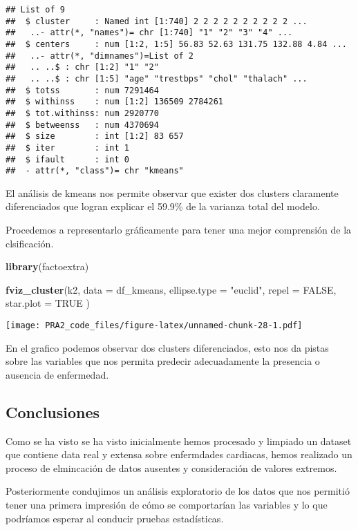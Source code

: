 \documentclass[
]{article}
\newenvironment{Shaded}{\begin{snugshade}}{\end{snugshade}}
\newcommand{\DataTypeTok}[1]{\textcolor[rgb]{0.13,0.29,0.53}{#1}}
\newcommand{\KeywordTok}[1]{\textcolor[rgb]{0.13,0.29,0.53}{\textbf{#1}}}
\newcommand{\NormalTok}[1]{#1}
\newcommand{\OtherTok}[1]{\textcolor[rgb]{0.56,0.35,0.01}{#1}}
\newcommand{\StringTok}[1]{\textcolor[rgb]{0.31,0.60,0.02}{#1}}
\begin{document}
\begin{verbatim}
## List of 9
##  $ cluster     : Named int [1:740] 2 2 2 2 2 2 2 2 2 2 ...
##   ..- attr(*, "names")= chr [1:740] "1" "2" "3" "4" ...
##  $ centers     : num [1:2, 1:5] 56.83 52.63 131.75 132.88 4.84 ...
##   ..- attr(*, "dimnames")=List of 2
##   .. ..$ : chr [1:2] "1" "2"
##   .. ..$ : chr [1:5] "age" "trestbps" "chol" "thalach" ...
##  $ totss       : num 7291464
##  $ withinss    : num [1:2] 136509 2784261
##  $ tot.withinss: num 2920770
##  $ betweenss   : num 4370694
##  $ size        : int [1:2] 83 657
##  $ iter        : int 1
##  $ ifault      : int 0
##  - attr(*, "class")= chr "kmeans"
\end{verbatim}

El análisis de kmeans nos permite observar que exister dos clusters
claramente diferenciados que logran explicar el 59.9\% de la varianza
total del modelo.

Procedemos a representarlo gráficamente para tener una mejor comprensión
de la clsificación.

\begin{Shaded}
\begin{Highlighting}[]
\KeywordTok{library}\NormalTok{(factoextra)}

\KeywordTok{fviz_cluster}\NormalTok{(k2, }\DataTypeTok{data =}\NormalTok{ df_kmeans, }\DataTypeTok{ellipse.type =} \StringTok{"euclid"}\NormalTok{, }\DataTypeTok{repel =} \OtherTok{FALSE}\NormalTok{, }\DataTypeTok{star.plot =} \OtherTok{TRUE}\NormalTok{ )}
\end{Highlighting}
\end{Shaded}

\texttt{[image: PRA2\_code\_files/figure-latex/unnamed-chunk-28-1.pdf]}

En el grafico podemos observar dos clusters diferenciados, esto nos da
pistas sobre las variables que nos permita predecir adecuadamente la
presencia o ausencia de enfermedad.

\hypertarget{conclusiones}{%
\subsection{Conclusiones}\label{conclusiones}}

Como se ha visto se ha visto inicialmente hemos procesado y limpiado un
dataset que contiene data real y extensa sobre enfermdades cardiacas,
hemos realizado un proceso de elmincación de datos ausentes y
consideración de valores extremos.

Posteriormente condujimos un análisis exploratorio de los datos que nos
permitió tener una primera impresión de cómo se comportarían las
variables y lo que podríamos esperar al conducir pruebas estadísticas.
\end{document}
